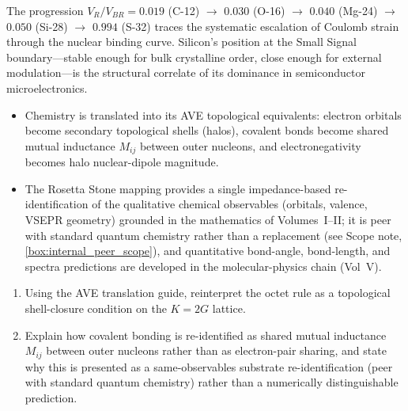 The progression $V_R/V_{BR} = 0.019$ (C-12) $\to$ $0.030$ (O-16) $\to$ $0.040$ (Mg-24) $\to$ $0.050$ (Si-28) $\to$ $0.994$ (S-32) traces the systematic escalation of Coulomb strain through the nuclear binding curve. Silicon's position at the Small Signal boundary---stable enough for bulk crystalline order, close enough for external modulation---is the structural correlate of its dominance in semiconductor microelectronics.

\begin{summarybox}
\begin{itemize}
    \item Chemistry is translated into its AVE topological equivalents: electron orbitals become secondary topological shells (halos), covalent bonds become shared mutual inductance $M_{ij}$ between outer nucleons, and electronegativity becomes halo nuclear-dipole magnitude.
    \item The Rosetta Stone mapping provides a single impedance-based re-identification of the qualitative chemical observables (orbitals, valence, VSEPR geometry) grounded in the mathematics of Volumes~I--II; it is peer with standard quantum chemistry rather than a replacement (see Scope note, \ref{box:internal_peer_scope}), and quantitative bond-angle, bond-length, and spectra predictions are developed in the molecular-physics chain (Vol~V).
\end{itemize}
\end{summarybox}

\begin{exercisebox}
\begin{enumerate}
    \item Using the AVE translation guide, reinterpret the octet rule as a topological shell-closure condition on the $K=2G$ lattice.
    \item Explain how covalent bonding is re-identified as shared mutual inductance $M_{ij}$ between outer nucleons rather than as electron-pair sharing, and state why this is presented as a same-observables substrate re-identification (peer with standard quantum chemistry) rather than a numerically distinguishable prediction.
\end{enumerate}
\end{exercisebox}

